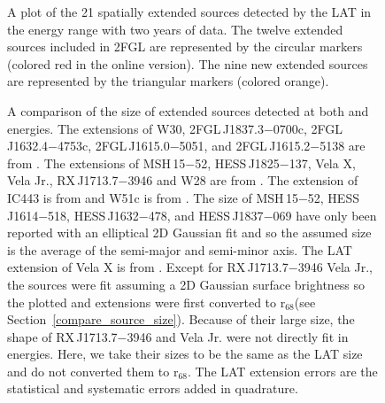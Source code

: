 \documentclass[12pt,preprint]{aastex}
\newif\ifcolorfigure
\newcommand{\gev}{\text{GeV}\xspace}
\newcommand{\tev}{\text{TeV}\xspace}
\newcommand{\rsixeight}{{\ensuremath{\text{r}_{68}}}\xspace}
\begin{document}
\clearpage
  \begin{figure}
      \ifcolorfigure
      \plotone{summary_plots/allsky_extended_sources_color.eps}
      \else
      \fi
      \caption{A plot of the 21
      spatially extended sources detected by the LAT
      in the \gev energy range
      with two years of data.  The twelve extended sources included in
      2FGL are represented by the circular markers (colored red in the online
      version).  The nine new extended sources are represented by
      the triangular markers (colored orange).}
\label{allsky_extended_sources}
  \end{figure}


\clearpage
\begin{figure}
    \ifcolorfigure
      \plotone{summary_plots/gev_vs_tev_plot_color.eps}
    \else
      \fi
    \caption{
    A comparison of the size of extended sources detected at
    both \gev and \tev energies.  The \tev extensions of W30,
    2FGL\,J1837.3$-$0700c, 2FGL\,J1632.4$-$4753c, 2FGL\,J1615.0$-$5051,
    and 2FGL\,J1615.2$-$5138 are from \cite{hess_plane_survey}.
    The \tev extensions of MSH\,15$-$52, HESS\,J1825$-$137,
    Vela X, Vela Jr., RX\,J1713.7$-$3946 and W28 are from
    \cite{msh_15_52_hess,hess_j1825_hess,vela_x_hess,vela_jr_hess,rx_j1713_hess,w28_hess}.
    The \tev extension of IC443 is from \cite{ic443_veritas} and
    W51c is from \cite{w51c_with_magic_at_fermi_symposium}.  The \tev
    size of MSH\,15$-$52, HESS\,J1614$-$518, HESS\,J1632$-$478, and
    HESS\,J1837$-$069 have only been reported with an elliptical 2D
    Gaussian fit and so the assumed size is the average of the semi-major
    and semi-minor axis.
    The LAT extension of
    Vela X is from \cite{velax}.  Except for RX\,J1713.7$-$3946 Vela Jr.,
    the \tev sources were fit assuming a 2D Gaussian surface brightness
    so the plotted \gev and \tev extensions were first converted to
    \rsixeight (see Section~\ref{compare_source_size}).  Because of
    their large size, the shape of RX\,J1713.7$-$3946 and Vela Jr.
    were not directly fit in \tev energies. Here, we take their sizes to be the
    same as the LAT size and do not converted them to \rsixeight. The LAT
    extension errors are the statistical and systematic errors added
    in quadrature. 
}\label{gev_vs_tev_plot}
  \end{figure}
\end{document}
